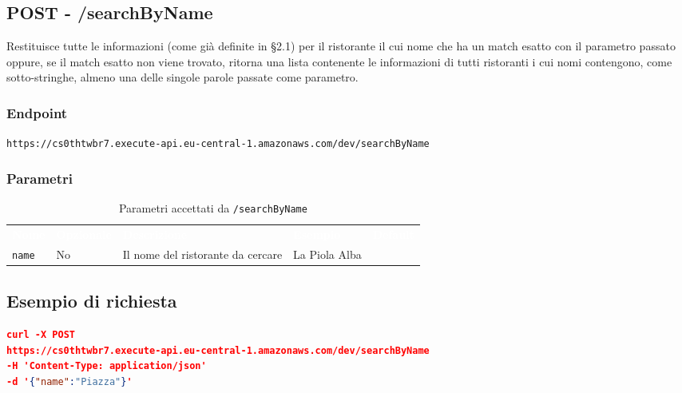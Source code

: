 \subsection{POST - /searchByName} 
Restituisce tutte le informazioni (come già definite in §2.1) per il ristorante il cui nome che ha un match esatto con il parametro passato oppure, se il match esatto non viene trovato, ritorna una lista contenente le informazioni di tutti ristoranti i cui nomi contengono, come sotto-stringhe, almeno una delle singole parole passate come parametro. 


\subsubsection{Endpoint}
\texttt{https://cs0thtwbr7.execute-api.eu-central-1.amazonaws.com/dev/searchByName}

\subsubsection{Parametri}
\begin{table}[!htbp]
\renewcommand{\arraystretch}{1.5}

\begin{tabular}[t]{ m{}<{\centering}  m{}<{\centering} m{}<{\centering} m{}<{\centering}  m{}<{\centering} }
	\rowcolor{darkblue}
	\textcolor{white}{\textbf{Nome}} &\textcolor{white}{\textbf{Opzionale}} &\textcolor{white}{\textbf{Descrizione}} &\textcolor{white}{\textbf{Esempio}} &\textcolor{white}{\textbf{Default}} \\ 
\texttt{name} & No & Il nome del ristorante da cercare & La Piola Alba &  \\

\end{tabular}
\caption{Parametri accettati da \texttt{/searchByName}}
\end{table}

\subsection{Esempio di richiesta}
\begin{lstlisting}[language=json]
curl -X POST 
https://cs0thtwbr7.execute-api.eu-central-1.amazonaws.com/dev/searchByName
-H 'Content-Type: application/json'
-d '{"name":"Piazza"}'

\end{lstlisting}

